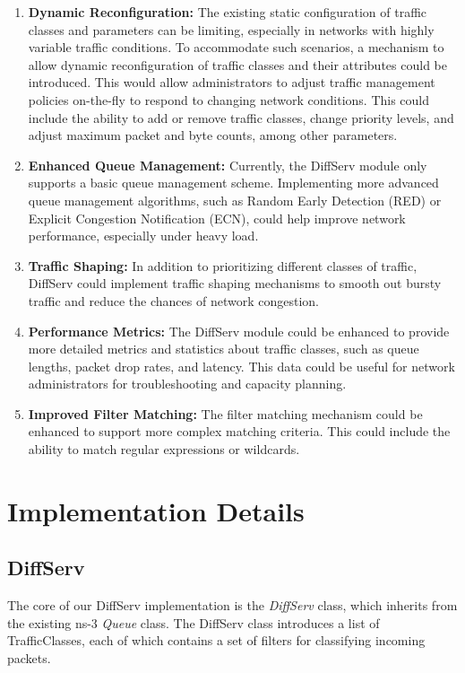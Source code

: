 \documentclass{article}
\begin{document}
\begin{enumerate}
  \item \textbf{Dynamic Reconfiguration:} The existing static configuration of traffic classes and parameters can be limiting, especially in networks with highly variable traffic conditions. To accommodate such scenarios, a mechanism to allow dynamic reconfiguration of traffic classes and their attributes could be introduced. This would allow administrators to adjust traffic management policies on-the-fly to respond to changing network conditions. This could include the ability to add or remove traffic classes, change priority levels, and adjust maximum packet and byte counts, among other parameters.

  \item \textbf{Enhanced Queue Management:} Currently, the DiffServ module only supports a basic queue management scheme. Implementing more advanced queue management algorithms, such as Random Early Detection (RED) or Explicit Congestion Notification (ECN), could help improve network performance, especially under heavy load.

  \item \textbf{Traffic Shaping:} In addition to prioritizing different classes of traffic, DiffServ could implement traffic shaping mechanisms to smooth out bursty traffic and reduce the chances of network congestion.

  \item \textbf{Performance Metrics:} The DiffServ module could be enhanced to provide more detailed metrics and statistics about traffic classes, such as queue lengths, packet drop rates, and latency. This data could be useful for network administrators for troubleshooting and capacity planning.

  \item \textbf{Improved Filter Matching:} The filter matching mechanism could be enhanced to support more complex matching criteria. This could include the ability to match regular expressions or wildcards.
\end{enumerate}

\section{Implementation Details}

\subsection{DiffServ}
The core of our DiffServ implementation is the \textit{DiffServ} class, which inherits from the existing ns-3 \textit{Queue} class. The DiffServ class introduces a list of TrafficClasses, each of which contains a set of filters for classifying incoming packets.
\end{document}
